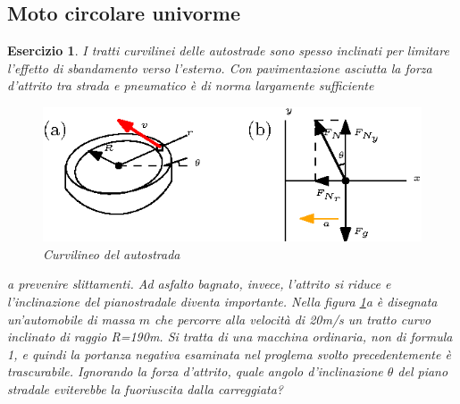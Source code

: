 \documentclass{article}
\newtheorem{es}{Esercizio}[section]
\begin{document}
\subsection{Moto circolare univorme}
\label{sec:motciruni}
\begin{es}
  I tratti curvilinei delle autostrade sono spesso inclinati per limitare l'effetto di sbandamento verso l'esterno. Con pavimentazione asciutta la forza d'attrito tra strada e pneumatico è di norma largamente sufficiente
  \begin{figure}[ht!]
    \centering
    \includegraphics{img/perc.eps}
    \caption{Curvilineo del autostrada}
    \label{fig:curvl}
  \end{figure}
  a prevenire slittamenti. Ad asfalto bagnato, invece, l'attrito si riduce e l'inclinazione del pianostradale diventa importante. Nella figura \ref{fig:curvl}a è disegnata un'automobile di massa $m$ che percorre alla velocità di 20m/s un tratto curvo inclinato di raggio R=190m. Si tratta di una macchina ordinaria, non di formula 1, e quindi la portanza negativa esaminata nel proglema svolto precedentemente è trascurabile. Ignorando la forza d'attrito, quale angolo d'inclinazione $\theta$ del piano stradale eviterebbe la fuoriuscita dalla carreggiata?
\end{es}
\end{document}
